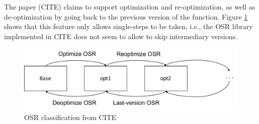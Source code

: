 The paper (CITE) claims to support optimization and re-optimization, as well as de-optimization by going back to the previous version of the function.
Figure \ref{OSR classification} shows that this feature only allows single-steps to be taken, i.e., the OSR library implemented in CITE does not seem to allow to skip intermediary versions.\\

\begin{figure}[h]
\centering
\includegraphics[scale=0.5]{Figures/OSRClassification}
\decoRule
\caption[OSR classification]{OSR classification from CITE}
\label{OSR classification}
\end{figure}

